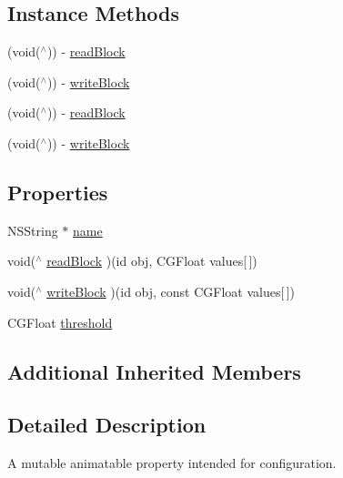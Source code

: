 \subsection*{Instance Methods}
\begin{DoxyCompactItemize}
\item 
(void($^\wedge$)) -\/ \mbox{\hyperlink{interface_p_o_p_mutable_animatable_property_add2b4f9d4d955dcf9ae478aee2b82e1f}{read\+Block}}
\item 
(void($^\wedge$)) -\/ \mbox{\hyperlink{interface_p_o_p_mutable_animatable_property_af66c1a8f0245be80b2dfa790d5b84a75}{write\+Block}}
\item 
(void($^\wedge$)) -\/ \mbox{\hyperlink{interface_p_o_p_mutable_animatable_property_add2b4f9d4d955dcf9ae478aee2b82e1f}{read\+Block}}
\item 
(void($^\wedge$)) -\/ \mbox{\hyperlink{interface_p_o_p_mutable_animatable_property_af66c1a8f0245be80b2dfa790d5b84a75}{write\+Block}}
\end{DoxyCompactItemize}
\subsection*{Properties}
\begin{DoxyCompactItemize}
\item 
N\+S\+String $\ast$ \mbox{\hyperlink{interface_p_o_p_mutable_animatable_property_aacf5e3b67c7f6327a61e60e716dd88ff}{name}}
\item 
void($^\wedge$ \mbox{\hyperlink{interface_p_o_p_mutable_animatable_property_aa49466ba2355cf59f8f7b4ffd4cf7eab}{read\+Block}} )(id obj, C\+G\+Float values\mbox{[}$\,$\mbox{]})
\item 
void($^\wedge$ \mbox{\hyperlink{interface_p_o_p_mutable_animatable_property_aa91bb67f295d7019466afbae915d8c83}{write\+Block}} )(id obj, const C\+G\+Float values\mbox{[}$\,$\mbox{]})
\item 
C\+G\+Float \mbox{\hyperlink{interface_p_o_p_mutable_animatable_property_a8a5a6b98c78a460910291c150849b3e0}{threshold}}
\end{DoxyCompactItemize}
\subsection*{Additional Inherited Members}


\subsection{Detailed Description}
A mutable animatable property intended for configuration. 

